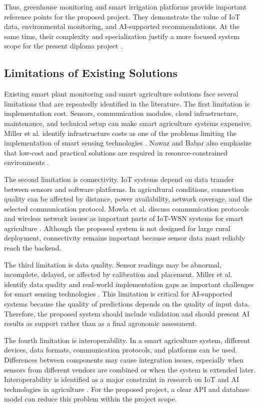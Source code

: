 Thus, greenhouse monitoring and smart irrigation platforms provide important reference points for the proposed project. They demonstrate the value of IoT data, environmental monitoring, and AI-supported recommendations. At the same time, their complexity and specialization justify a more focused system scope for the present diploma project \cite{gaitan2025integrating,raju2022hydroponics,nawaz2025iot}.
\subsection{Limitations of Existing Solutions}

Existing smart plant monitoring and smart agriculture solutions face several limitations that are repeatedly identified in the literature. The first limitation is implementation cost. Sensors, communication modules, cloud infrastructure, maintenance, and technical setup can make smart agriculture systems expensive. Miller et al. identify infrastructure costs as one of the problems limiting the implementation of smart sensing technologies \cite{miller2025iot}. Nawaz and Babar also emphasize that low-cost and practical solutions are required in resource-constrained environments \cite{nawaz2025iot}.

The second limitation is connectivity. IoT systems depend on data transfer between sensors and software platforms. In agricultural conditions, connection quality can be affected by distance, power availability, network coverage, and the selected communication protocol. Mowla et al. discuss communication protocols and wireless network issues as important parts of IoT-WSN systems for smart agriculture \cite{mowla2023iot}. Although the proposed system is not designed for large rural deployment, connectivity remains important because sensor data must reliably reach the backend.

The third limitation is data quality. Sensor readings may be abnormal, incomplete, delayed, or affected by calibration and placement. Miller et al. identify data quality and real-world implementation gaps as important challenges for smart sensing technologies \cite{miller2025iot}. This limitation is critical for AI-supported systems because the quality of predictions depends on the quality of input data. Therefore, the proposed system should include validation and should present AI results as support rather than as a final agronomic assessment.

The fourth limitation is interoperability. In a smart agriculture system, different devices, data formats, communication protocols, and platforms can be used. Differences between components may cause integration issues, especially when sensors from different vendors are combined or when the system is extended later. Interoperability is identified as a major constraint in research on IoT and AI technologies in agriculture \cite{miller2025iot,mowla2023iot}. For the proposed project, a clear API and database model can reduce this problem within the project scope.


